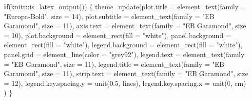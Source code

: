 \documentclass[
  10pt,
  letterpaper,
  DIV=11,
  numbers=noendperiod,
  twoside]{scrartcl}
\newenvironment{Shaded}{\begin{snugshade}}{\end{snugshade}}
\newcommand{\AttributeTok}[1]{\textcolor[rgb]{0.40,0.45,0.13}{#1}}
\newcommand{\ControlFlowTok}[1]{\textcolor[rgb]{0.00,0.23,0.31}{\textbf{#1}}}
\newcommand{\DecValTok}[1]{\textcolor[rgb]{0.68,0.00,0.00}{#1}}
\newcommand{\FloatTok}[1]{\textcolor[rgb]{0.68,0.00,0.00}{#1}}
\newcommand{\FunctionTok}[1]{\textcolor[rgb]{0.28,0.35,0.67}{#1}}
\newcommand{\NormalTok}[1]{\textcolor[rgb]{0.00,0.23,0.31}{#1}}
\newcommand{\SpecialCharTok}[1]{\textcolor[rgb]{0.37,0.37,0.37}{#1}}
\newcommand{\StringTok}[1]{\textcolor[rgb]{0.13,0.47,0.30}{#1}}
\begin{document}
\begin{Shaded}
\begin{Highlighting}[]
\ControlFlowTok{if}\NormalTok{(knitr}\SpecialCharTok{::}\FunctionTok{is\_latex\_output}\NormalTok{()) \{}
\FunctionTok{theme\_update}\NormalTok{(}\AttributeTok{plot.title =} \FunctionTok{element\_text}\NormalTok{(}\AttributeTok{family =} \StringTok{"Europa{-}Bold"}\NormalTok{, }\AttributeTok{size =} \DecValTok{14}\NormalTok{),}
             \AttributeTok{plot.subtitle =} \FunctionTok{element\_text}\NormalTok{(}\AttributeTok{family =} \StringTok{"EB Garamond"}\NormalTok{, }\AttributeTok{size =} \DecValTok{11}\NormalTok{),}
             \AttributeTok{axis.text =} \FunctionTok{element\_text}\NormalTok{(}\AttributeTok{family =} \StringTok{"EB Garamond"}\NormalTok{, }\AttributeTok{size =} \DecValTok{10}\NormalTok{),}
             \AttributeTok{plot.background =} \FunctionTok{element\_rect}\NormalTok{(}\AttributeTok{fill =} \StringTok{"white"}\NormalTok{),}
             \AttributeTok{panel.background =} \FunctionTok{element\_rect}\NormalTok{(}\AttributeTok{fill =} \StringTok{"white"}\NormalTok{),}
             \AttributeTok{legend.background =} \FunctionTok{element\_rect}\NormalTok{(}\AttributeTok{fill =} \StringTok{"white"}\NormalTok{),}
             \AttributeTok{panel.grid =} \FunctionTok{element\_line}\NormalTok{(}\AttributeTok{color =} \StringTok{"grey92"}\NormalTok{),}
             \AttributeTok{legend.text =} \FunctionTok{element\_text}\NormalTok{(}\AttributeTok{family =} \StringTok{"EB Garamond"}\NormalTok{, }\AttributeTok{size =} \DecValTok{11}\NormalTok{),}
            \AttributeTok{legend.title =} \FunctionTok{element\_text}\NormalTok{(}\AttributeTok{family =} \StringTok{"EB Garamond"}\NormalTok{, }\AttributeTok{size =} \DecValTok{11}\NormalTok{),}
             \AttributeTok{strip.text =} \FunctionTok{element\_text}\NormalTok{(}\AttributeTok{family =} \StringTok{"EB Garamond"}\NormalTok{, }\AttributeTok{size =} \DecValTok{12}\NormalTok{),}
             \AttributeTok{legend.key.spacing.y =} \FunctionTok{unit}\NormalTok{(}\FloatTok{0.5}\NormalTok{, }\StringTok{\textquotesingle{}lines\textquotesingle{}}\NormalTok{),}
             \AttributeTok{legend.key.spacing.x =} \FunctionTok{unit}\NormalTok{(}\DecValTok{0}\NormalTok{, }\StringTok{\textquotesingle{}cm\textquotesingle{}}\NormalTok{)}
\NormalTok{  )}
\NormalTok{\}}
\end{Highlighting}
\end{Shaded}
\end{document}
